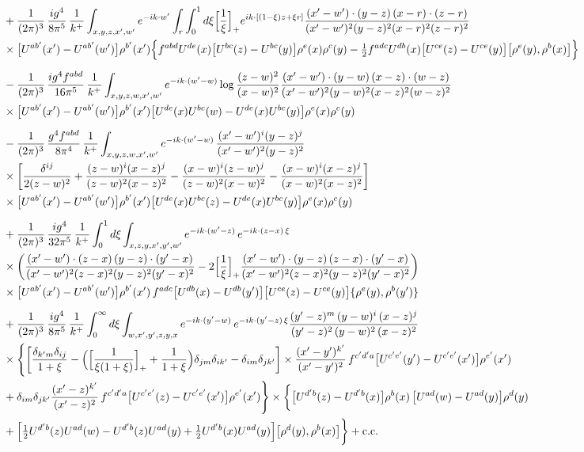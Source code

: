 \documentclass[10pt]{article}
\begin{document}
\begin{align}
&+\frac{1}{(2\pi)^{3}}\,\frac{ig^{4}}{8\pi^{5}}\,\frac{1}{k^{+}}\int_{x,y,z,x',w'}e^{-ik\cdot w'}\int_{r}\int_{0}^{1}d\xi\Big[\frac1\xi\Big]_{+}e^{ik\cdot[(1-\xi)z+\xi r]}\frac{(x'-w')\cdot(y-z)\,(x-r)\cdot(z-r)}{(x'-w')^{2}(y-z)^{2}(x-r)^{2}(z-r)^{2}}\notag\\
&\times\big[U^{ab'}(x')-U^{ab'}(w')\big]\rho^{b'}(x')\Big\{f^{abd}U^{de}(x)\big[U^{bc}(z)-U^{bc}(y)\big]\rho^{e}(x)\rho^{c}(y)-\tfrac12f^{adc}U^{db}(x)\big[U^{ce}(z)-U^{ce}(y)\big]\big[\rho^{e}(y),\rho^{b}(x)\big]\Big\}\notag\\[6pt]
&-\frac{1}{(2\pi)^{3}}\,\frac{ig^{4}f^{abd}}{16\pi^{5}}\,\frac{1}{k^{+}}\int_{x,y,z,w,x',w'}e^{-ik\cdot(w'-w)}\log\frac{(z-w)^{2}}{(x-w)^{2}}\frac{(x'-w')\cdot(y-w)\,(x-z)\cdot(w-z)}{(x'-w')^{2}(y-w)^{2}(x-z)^{2}(w-z)^{2}}\notag\\
&\times\big[U^{ab'}(x')-U^{ab'}(w')\big]\rho^{b'}(x')\big[U^{de}(x)U^{bc}(w)-U^{de}(x)U^{bc}(y)\big]\rho^{e}(x)\rho^{c}(y)\notag\\[6pt]
&-\frac{1}{(2\pi)^{3}}\,\frac{g^{4}f^{abd}}{8\pi^{4}}\,\frac{1}{k^{+}}\int_{x,y,z,w,x',w'}e^{-ik\cdot(w'-w)}\,\frac{(x'-w')^{i}(y-z)^{j}}{(x'-w')^{2}(y-z)^{2}}\notag\\
&\times\bigg[\frac{\delta^{ij}}{2(z-w)^{2}}+\frac{(z-w)^{i}(x-z)^{j}}{(z-w)^{2}(x-z)^{2}}-\frac{(x-w)^{i}(z-w)^{j}}{(z-w)^{2}(x-w)^{2}}-\frac{(x-w)^{i}(x-z)^{j}}{(x-w)^{2}(x-z)^{2}}\bigg]\notag\\
&\times\big[U^{ab'}(x')-U^{ab'}(w')\big]\rho^{b'}(x')\big[U^{de}(x)U^{bc}(z)-U^{de}(x)U^{bc}(y)\big]\rho^{e}(x)\rho^{c}(y)\notag\\[6pt]
&+\frac{1}{(2\pi)^{3}}\,\frac{ig^{4}}{32\pi^{5}}\,\frac{1}{k^{+}}\int_{0}^{1}d\xi\int_{x,z,y,x',y',w'}e^{-ik\cdot(w'-z)}\,e^{-ik\cdot(z-x)\,\xi}\notag\\
&\times\bigg(\frac{(x'-w')\cdot(z-x)\,(y-z)\cdot(y'-x)}{(x'-w')^{2}(z-x)^{2}(y-z)^{2}(y'-x)^{2}}-2\Big[\frac{1}{\xi}\Big]_{+}\frac{(x'-w')\cdot(y-z)\,(z-x)\cdot(y'-x)}{(x'-w')^{2}(z-x)^{2}(y-z)^{2}(y'-x)^{2}}\bigg)\notag\\
&\times\big[U^{ab'}(x')-U^{ab'}(w')\big]\rho^{b'}(x')\,f^{adc}\big[U^{db}(x)-U^{db}(y')\big]\big[U^{ce}(z)-U^{ce}(y)\big]\{\rho^{e}(y),\rho^{b}(y')\}\notag\\[6pt]
&+\frac{1}{(2\pi)^{3}}\,\frac{ig^{4}}{8\pi^{5}}\,\frac{1}{k^{+}}\int_{0}^{\infty}d\xi\int_{w,x',y',z,y,x}e^{-ik\cdot(y'-w)}\,e^{-ik\cdot(y'-z)\,\xi}\frac{(y'-z)^{m}\,(y-w)^{i}\,(x-z)^{j}}{(y'-z)^{2}\,(y-w)^{2}\,(x-z)^{2}}\notag\\
&\times\Bigg\{\bigg[\frac{\delta_{k'm}\delta_{ij}}{1+\xi}-\Big(\Big[\frac{1}{\xi(1+\xi)}\Big]_{+}+\frac{1}{1+\xi}\Big)\delta_{jm}\delta_{ik'}-\delta_{im}\delta_{jk'}\bigg]\times\frac{(x'-y')^{k'}}{(x'-y')^{2}}\,f^{c'd'a}\big[U^{c'e'}(y')-U^{c'e'}(x')\big]\rho^{e'}(x')\notag\\
&+\delta_{im}\delta_{jk'}\frac{(x'-z)^{k'}}{(x'-z)^{2}}\,f^{c'd'a}\big[U^{c'e'}(z)-U^{c'e'}(x')\big]\rho^{e'}(x')\Bigg\}\times\bigg\{\big[U^{d'b}(z)-U^{d'b}(x)\big]\rho^{b}(x)\,\big[U^{ad}(w)-U^{ad}(y)\big]\rho^{d}(y)\notag\\
&+\Big[\tfrac12U^{d'b}(z)U^{ad}(w)-U^{d'b}(z)U^{ad}(y)+\tfrac12U^{d'b}(x)U^{ad}(y)\Big]\big[\rho^{d}(y),\rho^{b}(x)\big]\bigg\}+{\rm c.c.}
\end{align}
\end{document}
